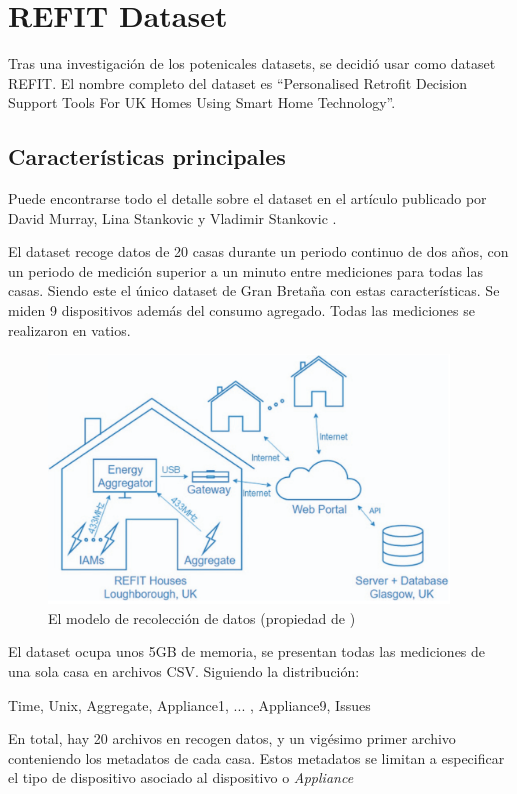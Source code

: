 \section{REFIT Dataset}
Tras una investigación de los potenicales datasets, se decidió usar como dataset REFIT. El nombre completo del dataset es \enquote{Personalised Retrofit Decision Support Tools For UK Homes Using Smart Home Technology}\autocite{REFIT}.
\subsection{Características principales}
Puede encontrarse todo el detalle sobre el dataset en el artículo publicado por David Murray, Lina Stankovic y Vladimir Stankovic \autocite{REFIT}.

El dataset recoge datos de 20 casas durante un periodo continuo de dos años, con un periodo de medición superior a un minuto entre mediciones para todas las casas. Siendo este el único dataset de Gran Bretaña con estas características.
Se miden 9 dispositivos además del consumo agregado. Todas las mediciones se realizaron en vatios. 

\begin{figure}
    \centering
    \includegraphics[height=250px]{images/REFITmodeloDatos.png}
    \caption{El modelo de recolección de datos (propiedad de \autocite{REFIT})}
    \label{diagramaBBDD}
\end{figure}

El dataset ocupa unos 5GB de memoria, se presentan todas las mediciones de una sola casa en archivos CSV. Siguiendo la distribución:
\begin{center}
    Time, Unix, Aggregate, Appliance1, ... , Appliance9, Issues
\end{center}
En total, hay 20 archivos en recogen datos, y un vigésimo primer archivo conteniendo los metadatos de cada casa. Estos metadatos se limitan a especificar el tipo de dispositivo asociado al dispositivo o \textit{Appliance} 

